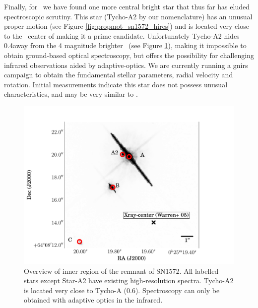 Finally, for \ we have found one more central bright star that thus far has eluded spectroscopic scrutiny. This star (Tycho-A2 by our nomenclature) has an unusual proper motion (see Figure \vref{fig:propmot_sn1572_hires}) and is located very close to the \xray\ center of  making it a prime candidate. Unfortunately Tycho-A2 hides 0.4\arcsec away from the 4 magnitude brighter \stara\ (see Figure \ref{fig:stara2_overview}), making it impossible to obtain ground-based optical spectroscopy, but offers the possibility for challenging infrared observations aided by adaptive-optics. We are currently running a \gls{gnirs} campaign to obtain the fundamental stellar parameters, radial velocity and rotation.  Initial measurements indicate this star does not possess unusual characteristics, and may be very similar to \stara.

\begin{figure}[tb] %
   \centering
   \includegraphics[width=\textwidth, trim=0 0 2cm 0, clip]{chapter_conclusion/plots/overview_sn1572_a2.pdf} 
   \caption[Close-up of the inner region of SN 1572 with candidates]{Overview of inner region of the remnant of SN1572. All labelled stars except Star-A2 have existing high-resolution spectra. Tycho-A2 is located very close to Tycho-A (0.6\arcsec). Spectroscopy can only be obtained with adaptive optics in the infrared.}
   \label{fig:stara2_overview}
\end{figure}

